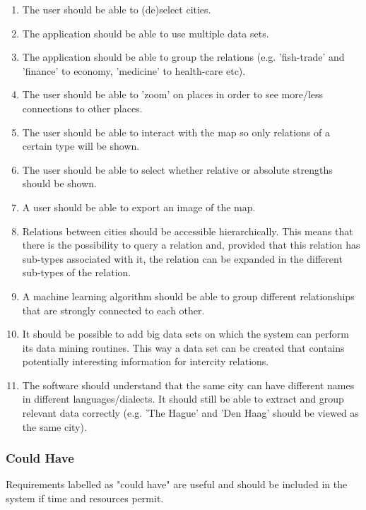 \begin{enumerate}
    \item The user should be able to (de)select cities.
    \item The application should be able to use multiple data sets.
    \item The application should be able to group the relations (e.g. 'fish-trade' and 'finance' to economy, 'medicine' to health-care etc).
    \item The user should be able to 'zoom' on places in order to see more/less connections to other places.
    \item The user should be able to interact with the map so only relations of a certain type will be shown.
    \item The user should be able to select whether relative or absolute strengths should be shown.
    \item A user should be able to export an image of the map.
    \item Relations between cities should be accessible hierarchically. This means that there is the possibility to query a relation and, provided that this relation has sub-types associated with it, the relation can be expanded in the different sub-types of the relation.
    \item A machine learning algorithm should be able to group different relationships that are strongly connected to each other.
    \item It should be possible to add big data sets on which the system can perform its data mining routines. This way a data set can be created that contains potentially interesting information for intercity relations.
    \item The software should understand that the same city can have different names in different languages/dialects. It should still be able to extract and group relevant data correctly (e.g. 'The Hague' and 'Den Haag' should be viewed as the same city).
\end{enumerate}
\fi
\subsubsection {Could Have}
Requirements labelled as "could have" are useful and should be included in the system if time and resources permit.


